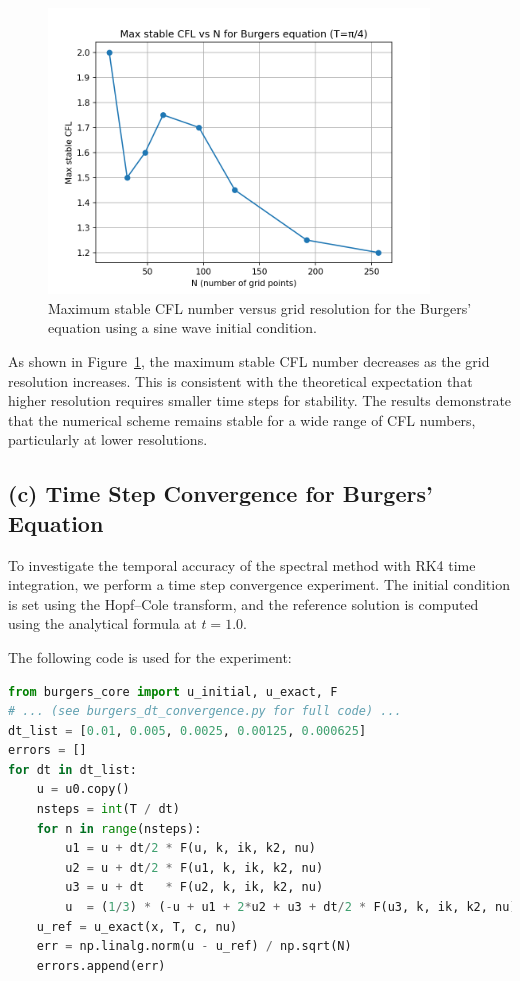 \documentclass{article}
\begin{document}
\begin{figure}[htbp]
    \centering
    \includegraphics[width=0.9\textwidth]{figure/burgers_cfl_stability.png}
    \caption{Maximum stable CFL number versus grid resolution for the Burgers' equation using a sine wave initial condition.}
    \label{fig:burgers_cfl_stability}
\end{figure}

As shown in Figure~\ref{fig:burgers_cfl_stability}, the maximum stable CFL number decreases as the grid resolution increases. This is consistent with the theoretical expectation that higher resolution requires smaller time steps for stability. The results demonstrate that the numerical scheme remains stable for a wide range of CFL numbers, particularly at lower resolutions.

\subsection*{(c) Time Step Convergence for Burgers' Equation}
To investigate the temporal accuracy of the spectral method with RK4 time integration, we perform a time step convergence experiment. The initial condition is set using the Hopf--Cole transform, and the reference solution is computed using the analytical formula at $t=1.0$.

The following code is used for the experiment:

\begin{lstlisting}[language=Python]
from burgers_core import u_initial, u_exact, F
# ... (see burgers_dt_convergence.py for full code) ...
dt_list = [0.01, 0.005, 0.0025, 0.00125, 0.000625]
errors = []
for dt in dt_list:
    u = u0.copy()
    nsteps = int(T / dt)
    for n in range(nsteps):
        u1 = u + dt/2 * F(u, k, ik, k2, nu)
        u2 = u + dt/2 * F(u1, k, ik, k2, nu)
        u3 = u + dt   * F(u2, k, ik, k2, nu)
        u  = (1/3) * (-u + u1 + 2*u2 + u3 + dt/2 * F(u3, k, ik, k2, nu))
    u_ref = u_exact(x, T, c, nu)
    err = np.linalg.norm(u - u_ref) / np.sqrt(N)
    errors.append(err)
\end{lstlisting}
\end{document}
